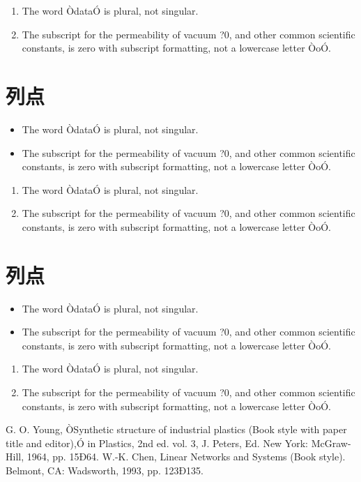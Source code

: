 \documentclass[letterpaper, 10pt, conference, twoside]{ieeeconf}
\begin{document}
\begin{enumerate}
\item The word ÒdataÓ is plural, not singular.
\item The subscript for the permeability of vacuum ?0, and other common scientific constants, is zero with subscript formatting, not a lowercase letter ÒoÓ.
\end{enumerate}

\section{列点}

\begin{itemize}
\item The word ÒdataÓ is plural, not singular.
\item The subscript for the permeability of vacuum ?0, and other common scientific constants, is zero with subscript formatting, not a lowercase letter ÒoÓ.
\end{itemize}

\begin{enumerate}
\item The word ÒdataÓ is plural, not singular.
\item The subscript for the permeability of vacuum ?0, and other common scientific constants, is zero with subscript formatting, not a lowercase letter ÒoÓ.
\end{enumerate}

\section{列点}

\begin{itemize}
\item The word ÒdataÓ is plural, not singular.
\item The subscript for the permeability of vacuum ?0, and other common scientific constants, is zero with subscript formatting, not a lowercase letter ÒoÓ.
\end{itemize}

\begin{enumerate}
\item The word ÒdataÓ is plural, not singular.
\item The subscript for the permeability of vacuum ?0, and other common scientific constants, is zero with subscript formatting, not a lowercase letter ÒoÓ.
\end{enumerate}


\begin{thebibliography}{99}

 G. O. Young, ÒSynthetic structure of industrial plastics (Book style with paper title and editor),Ó 	in Plastics, 2nd ed. vol. 3, J. Peters, Ed.  New York: McGraw-Hill, 1964, pp. 15Ð64.
 W.-K. Chen, Linear Networks and Systems (Book style).	Belmont, CA: Wadsworth, 1993, pp. 123Ð135.

\end{thebibliography}
\end{document}
